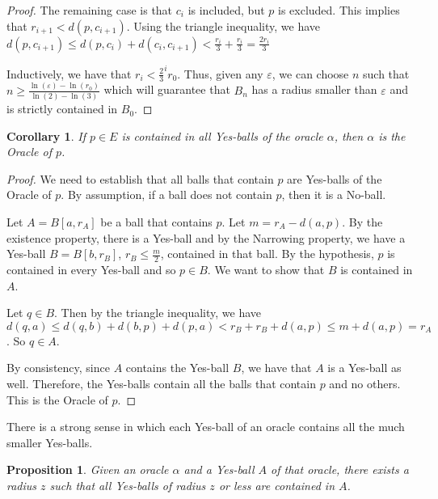 \documentclass[12pt]{article}
\newtheorem{corollary}{Corollary}[section]
\newtheorem{proposition}{Proposition}[section]
\begin{document}
\begin{proof}
The remaining case is that $c_i$ is included, but $p$ is excluded. This implies that $r_{i+1} < d(p, c_{i+1})$. Using the triangle inequality, we have $d(p, c_{i+1}) \leq d(p, c_i) + d(c_i, c_{i+1}) < \frac{r_i}{3} + \frac{r_i}{3} = \frac{2r_i}{3}$ 

Inductively, we have that $r_i < \frac{2}{3}^i r_0$. Thus, given any $\varepsilon$, we can choose $n$ such that $n \geq \frac{\ln(\varepsilon) - \ln(r_0)}{\ln(2) - \ln(3)}$ which will guarantee that $B_n$ has a radius smaller than $\varepsilon$ and is strictly contained in $B_0$.
\end{proof}

\begin{corollary}
If $p \in E$ is contained in all Yes-balls of the oracle $\alpha$, then $\alpha$ is the Oracle of $p$. 
\end{corollary}

\begin{proof}
We need to establish that all balls that contain $p$ are Yes-balls of the Oracle of $p$. By assumption, if a ball does not contain $p$, then it is a No-ball. 

Let $A = B[a, r_A]$ be a ball that contains $p$. Let $m = r_A - d(a,p)$. By the existence property, there is a Yes-ball and by the Narrowing property, we have a Yes-ball $B = B[b, r_B]$, $r_B \leq \frac{m}{2}$, contained in that ball. By the hypothesis, $p$ is contained in every Yes-ball and so $p \in B$. We want to show that $B$ is contained in $A$. 

Let $q \in B$. Then by the triangle inequality, we have $d(q, a) \leq d(q, b) + d(b, p) +  d(p,a) < r_B + r_B + d(a,p) \leq m + d(a,p) = r_A$. So $q \in A$. 

By consistency, since $A$ contains the Yes-ball $B$, we have that $A$ is a Yes-ball as well. Therefore, the Yes-balls contain all the balls that contain $p$ and no others. This is the Oracle of $p$. 
\end{proof}



There is a strong sense in which each Yes-ball of an oracle contains all the much smaller Yes-balls. 

\begin{proposition}
    Given an oracle $\alpha$ and a Yes-ball $A$ of that oracle, there exists a radius $z$ such that all Yes-balls of radius $z$ or less are contained in $A$. 
\end{proposition}
\end{document}
